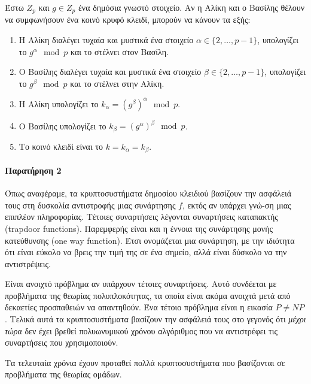  Έστω $ Z_p $ και $ g \in Z_p $ ένα δημόσια γνωστό στοιχείο. Αν η Αλίκη και ο Βασίλης θέλουν να συμφωνήσουν ένα κοινό κρυφό κλειδί, μπορούν να κάνουν τα εξής:
\begin{enumerate}
\item Η Αλίκη διαλέγει τυχαία και μυστικά ένα στοιχείο $ \alpha \in \{2,\dots,p-1\} $, υπολογίζει το $ g^\alpha \mod p $ και το στέλνει στον Βασίλη.
\item Ο Βασίλης διαλέγει τυχαία και μυστικά ένα στοιχείο $ \beta \in \{2,\dots,p-1\} $, υπολογίζει το $ g^\beta \mod p $ και το στέλνει στην Αλίκη.
\item Η Αλίκη υπολογίζει το $ k_\alpha = \left( g^\beta\right)^\alpha \mod p$.
\item Ο Βασίλης υπολογίζει το $ k_\beta = \left( g^\alpha\right)^\beta \mod p$.
\item Το κοινό κλειδί είναι το $ k = k_\alpha = k_\beta $.
\end{enumerate}


\paragraph{Παρατήρηση 2}Όπως αναφέραμε, τα κρυπτοσυστήματα δημοσίου κλειδιού βασίζουν την ασφάλειά τους στη δυσκολία αντιστροφής μιας συνάρτησης $f$, εκτός αν υπάρχει γνώ-ση μιας επιπλέον πληροφορίας. Τέτοιες συναρτήσεις λέγονται συναρτήσεις καταπακτής (trapdoor functions). Παρεμφερής είναι και η έννοια της συνάρτησης μονής κατεύθυνσης (one way function). Έτσι ονομάζεται μια συνάρτηση, με την ιδιότητα ότι είναι εύκολο να βρεις την τιμή της σε ένα σημείο, αλλά είναι δύσκολο να την αντιστρέψεις.

Είναι ανοιχτό πρόβλημα αν υπάρχουν τέτοιες συναρτήσεις. Αυτό συνδέεται με προβλήματα της θεωρίας πολυπλοκότητας, τα οποία είναι ακόμα ανοιχτά μετά από δεκαετίες προσπαθειών να απαντηθούν. Ένα τέτοιο πρόβλημα είναι η εικασία $P\neq NP$. Τελικά αυτά τα κρυπτοσυστήματα βασίζουν την ασφάλειά τους στο γεγονός ότι \emph{μέχρι τώρα} δεν έχει βρεθεί πολυωνυμικού χρόνου αλγόριθμος που να αντιστρέφει τις συναρτήσεις που χρησιμοποιούν.   

Τα τελευταία χρόνια έχουν προταθεί πολλά κρυπτοσυστήματα που βασίζονται σε προβλήματα της θεωρίας ομάδων. 


